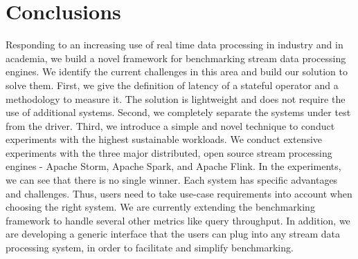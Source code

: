 \section{Conclusions}
\label{conc}

Responding to an increasing use of real time data processing in industry and in academia, we build a novel framework for benchmarking stream data processing engines. We identify the current challenges in this area and build our solution to solve them. First, we give the  definition of latency of a stateful operator and a methodology to measure it. The solution is lightweight and does not require the use of additional systems. Second, we completely separate the systems under test from the driver.  Third, we introduce a simple and novel technique to conduct  experiments with the highest sustainable workloads. %
We conduct extensive experiments with the three major distributed, open source stream processing engines - Apache Storm, Apache Spark, and Apache Flink. In the experiments, we can see that there is no single winner.  Each system has specific advantages and challenges. Thus, users need to take use-case requirements into account when choosing the right system. 
We are currently extending the benchmarking framework to handle several other metrics like query throughput. In addition, we are developing a generic interface that the users can plug into any stream data processing system, in order to facilitate and simplify benchmarking.
